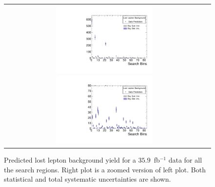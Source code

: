 \begin{figure}[htbp]
  \begin{center}
  \begin{tabular}{cc}
  \includegraphics[angle=0,width=0.5\textwidth]{sections/mc4/Backgrounds/TF/figures/pred_full_lostle_comb.pdf}
  \includegraphics[angle=0,width=0.5\textwidth]{sections/mc4/Backgrounds/TF/figures/pred_zoomin_lostle_comb.pdf}
  \end{tabular}
  \caption{Predicted lost lepton background yield for a $35.9$~fb$^{-1}$ data for all the search regions. Right plot is a zoomed version of left plot.
Both statistical and total systematic uncertainties are shown. }
    \label{fig:LLpredictionSB}
  \end{center}
\end{figure}

